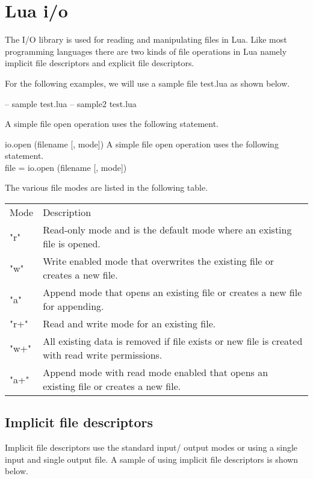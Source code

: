 \chapter{Lua i/o}
\label{ch:luaio}


The I/O library is used for reading and manipulating files in Lua. Like most programming languages there are two kinds of file operations in Lua namely implicit file descriptors and explicit file descriptors.

For the following examples, we will use a sample file test.lua as shown below.

\begin{phdverbatim}
-- sample test.lua
-- sample2 test.lua
\end{phdverbatim}

A simple file open operation uses the following statement.


\begin{docLua}{io.open (filename [, mode])}
A simple file open operation uses the following statement.\\
file = io.open (filename [, mode])
\end{docLua}

The various file modes are listed in the following table.

\begin{longtable}{ll}
Mode	& Description\\
"r"	& Read-only mode and is the default mode where an existing file is opened.\\
"w"	& Write enabled mode that overwrites the existing file or creates a new file.\\
"a"	& Append mode that opens an existing file or creates a new file for appending.\\
"r+"	& Read and write mode for an existing file.\\
"w+"	& All existing data is removed if file exists or new file is created with read write permissions.\\
"a+"	& Append mode with read mode enabled that opens an existing file or creates a new file.\\
\end{longtable}

\section{Implicit file descriptors}

Implicit file descriptors use the standard input/ output modes or using a single input and single output file. A sample of using implicit file descriptors is shown below.


